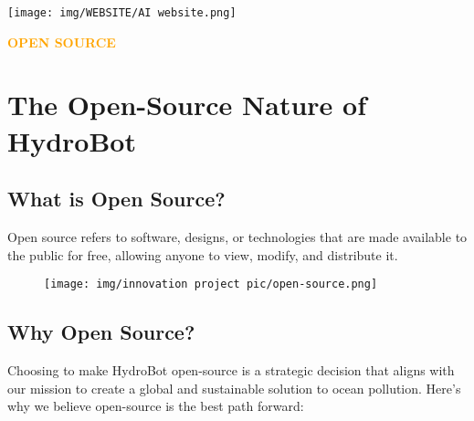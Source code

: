 \begin{center}
  \texttt{[image: img/WEBSITE/AI website.png]}
\end{center}





\newpage
\begin{center}
    \huge \textbf{\textcolor{orange}{OPEN SOURCE}} \\[0.5cm]
 
\end{center}
\section{\large \textbf{The Open-Source Nature of HydroBot}}

\subsection{{What is Open Source?}}

Open source refers to software, designs, or technologies that are made available to the public for free, allowing anyone to view, modify, and distribute it.
\vspace{1cm}
\begin{figure}[h!]
    \centering %
    \begin{minipage}{0.35\textwidth}
        \centering
        \texttt{[image: img/innovation project pic/open-source.png]}
    \end{minipage}
\end{figure}

\vspace{1cm}
\subsection{{Why Open Source?}}
Choosing to make HydroBot open-source is a strategic decision that aligns with our mission to create a global and sustainable solution to ocean pollution.  Here’s why we believe open-source is the best path forward:

